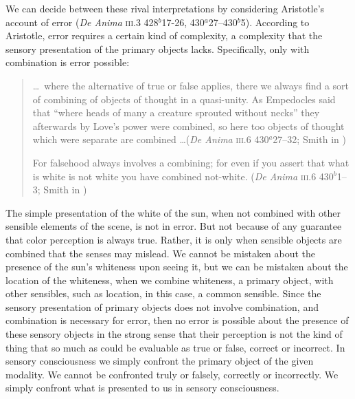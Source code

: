We can decide between these rival interpretations by considering Aristotle's account of error (\emph{De Anima} \textsc{iii}.3 428\( ^{b} \)17-26, 430\( ^{a} \)27--430\( ^{b} \)5). According to Aristotle, error requires a certain kind of complexity, a complexity that the sensory presentation of the primary objects lacks. Specifically, only with combination is error possible:
\begin{quote}
	\ldots\ where the alternative of true or false applies, there we always find a sort of combining of objects of thought in a quasi-unity. As Empedocles said that ``where heads of many a creature sprouted without necks'' they afterwards by Love’s power were combined, so here too objects of thought which were separate are combined \ldots (\emph{De Anima} \textsc{iii}.6 430\( ^{a} \)27--32; Smith in \citealt[54]{Barnes:1984uq})
	
	For falsehood always involves a combining; for even if you assert that what is white is not white you have combined not-white. (\emph{De Anima} \textsc{iii}.6 430\( ^{b} \)1--3; Smith in \citealt[54]{Barnes:1984uq})
\end{quote}
The simple presentation of the white of the sun, when not combined with other sensible elements of the scene, is not in error. But not because of any guarantee that color perception is always true. Rather, it is only when sensible objects are combined that the senses may mislead. We cannot be mistaken about the presence of the sun's whiteness upon seeing it, but we can be mistaken about the location of the whiteness, when we combine whiteness, a primary object, with other sensibles, such as location, in this case, a common sensible. Since the sensory presentation of primary objects does not involve combination, and combination is necessary for error, then no error is possible about the presence of these sensory objects in the strong sense that their perception is not the kind of thing that so much as could be evaluable as true or false, correct or incorrect. In sensory consciousness we simply confront the primary object of the given modality. We cannot be confronted truly or falsely, correctly or incorrectly. We simply confront what is presented to us in sensory consciousness. 

